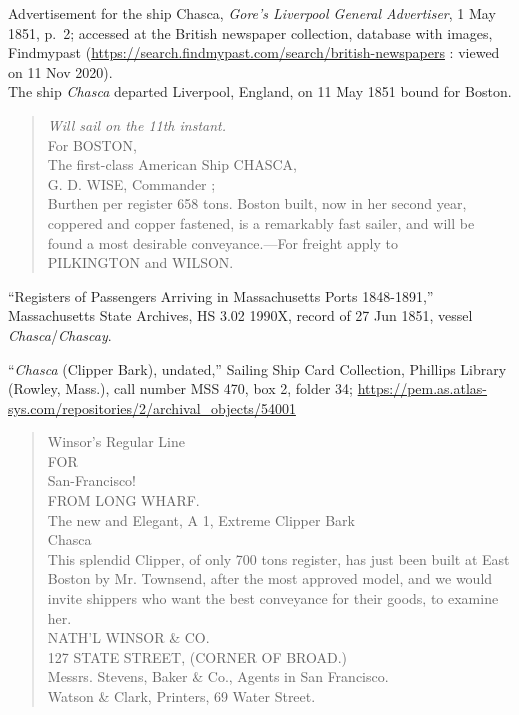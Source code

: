 \begin{thebibliography}{999}
Advertisement for the ship Chasca, \textit{Gore's Liverpool General Advertiser}, 1 May 1851, p.\ 2; accessed at the British newspaper collection, database with images, Findmypast (\url{https://search.findmypast.com/search/british-newspapers} : viewed on 11 Nov 2020).\\
The ship \textit{Chasca} departed Liverpool, England, on 11 May 1851 bound for Boston. 
\begin{quote}
	\textit{Will sail on the 11th instant.}\\
	For BOSTON,\\
	The first-class American Ship CHASCA,\\
	G. D. WISE, Commander ;\\
	Burthen per register 658 tons. Boston built, now in her second year, coppered and copper fastened, is a remarkably fast sailer, and will be found a most desirable conveyance.---For freight apply to\\
	PILKINGTON and WILSON.
\end{quote}

``Registers of Passengers Arriving in Massachusetts Ports 1848-1891,'' Massachusetts State Archives, HS 3.02 1990X, record of 27 Jun 1851, vessel \textit{Chasca}/\textit{Chascay}.

``\textit{Chasca} (Clipper Bark), undated,'' Sailing Ship Card Collection, Phillips Library (Rowley, Mass.), call number MSS 470, box 2, folder 34; \url{https://pem.as.atlas-sys.com/repositories/2/archival_objects/54001}\\
\begin{quote}
	Winsor's Regular Line\\
	FOR\\
	San-Francisco!\\
	FROM LONG WHARF.\\
	The new and Elegant, A 1, Extreme Clipper Bark\\
	Chasca\\
	This splendid Clipper, of only 700 tons register, has just been built at East Boston by Mr. Townsend, after the most approved model, and we would invite shippers who want the best conveyance for their goods, to examine her.\\
	NATH'L WINSOR \& CO.\\
	127 STATE STREET, (CORNER OF BROAD.)\\
	Messrs. Stevens, Baker \& Co., Agents in San Francisco.\\
	Watson \& Clark, Printers, 69 Water Street.	
\end{quote}


\end{thebibliography}
